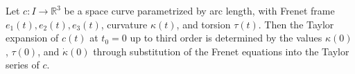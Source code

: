 Let $c: I \to \mathbb{R}^3$ be a space curve parametrized by arc length, with Frenet frame $e_1(t), e_2(t), e_3(t)$, curvature $\kappa(t)$, and torsion $\tau(t)$. Then the Taylor expansion of $c(t)$ at $t_0 = 0$ up to third order is determined by the values $\kappa(0)$, $\tau(0)$, and $\dot{\kappa}(0)$ through substitution of the Frenet equations into the Taylor series of $c$.
